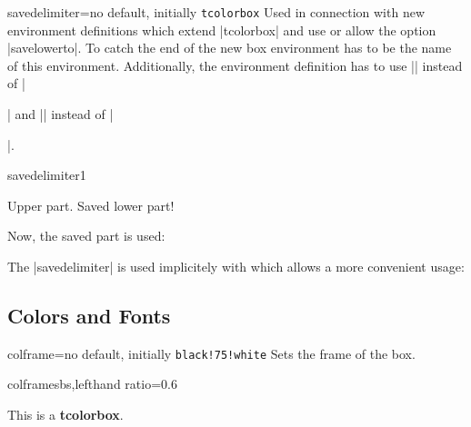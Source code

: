 \clearpage
\begin{docTcbKey}{savedelimiter}{=}{no default, initially \texttt{tcolorbox}}
  Used in connection with new environment definitions which extend
  |tcolorbox| and use or allow the option |savelowerto|.
  To catch the end of the new box environment  has to be the name of
  this environment. Additionally, the environment definition has to use
  |\tcolorbox| instead of
  |\begin{tcolorbox}| and |\endtcolorbox| instead of |\end{tcolorbox}|.
\begin{exdispExample}{savedelimiter1}
\newenvironment{mybox}[1]{%
  \tcolorbox[savedelimiter=mybox,
             savelowerto=\jobname_bspsave2.tex,lowerbox=ignored,
             colback=red!5!white,colframe=red!75!black,fonttitle=\bfseries,
             title={#1}]}%
  {\endtcolorbox}

\begin{mybox}{My Example}
Upper part.
\tcblower
Saved lower part!
\end{mybox}

Now, the saved part is used:
\begin{tcolorbox}[colback=green!5]

\end{tcolorbox}
\end{exdispExample}

\enlargethispage*{1cm}

The |savedelimiter| is used implicitely with  which
allows a more convenient usage:
\end{docTcbKey}



\clearpage
\subsection{Colors and Fonts}
\begin{docTcbKey}{colframe}{=}{no default, initially \texttt{black!75!white}}
  Sets the frame  of the box.
\begin{exdispExample*}{colframe}{sbs,lefthand ratio=0.6}
\begin{tcolorbox}[colframe=red!50!white]
This is a \textbf{tcolorbox}.
\end{tcolorbox}
\end{exdispExample*}
\end{docTcbKey}

